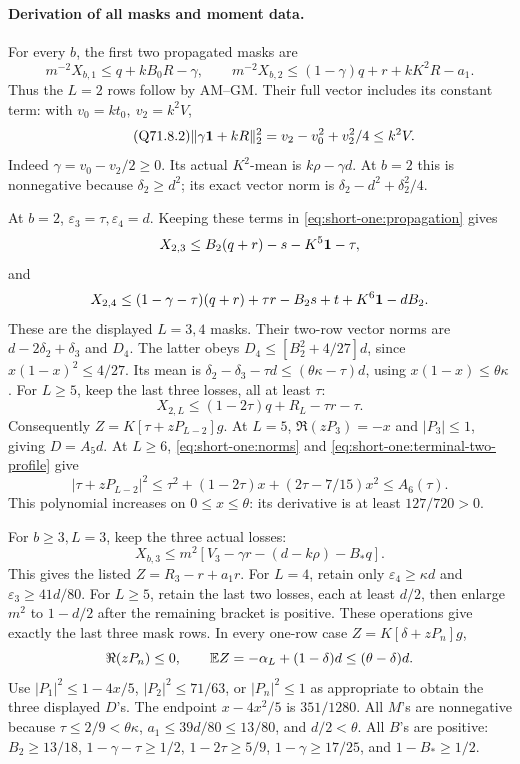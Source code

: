 \paragraph{Derivation of all masks and moment data.}
For every \(b\), the first two propagated masks are
\[
 m^{-2}X_{b,1}\le q+kB_0R-\gamma,\qquad
 m^{-2}X_{b,2}\le(1-\gamma)q+r+kK^2R-a_1 .
\]
Thus the \(L=2\) rows follow by AM--GM. Their full vector includes
its constant term: with \(v_0=kt_0,\ v_2=k^2V\),
\begin{equation}\tag{Q71.8.2}\label{eq:Q71:8.2}
 \|\gamma\mathbf1+kR\|_2^2=v_2-v_0^2+v_2^2/4\le k^2V .
\end{equation}
Indeed \(\gamma=v_0-v_2/2\ge0\). Its actual \(K^2\)-mean is
\(k\rho-\gamma d\). At \(b=2\) this is nonnegative because
\(\delta_2\ge d^2\); its exact vector norm is
\(\delta_2-d^2+\delta_2^2/4\).

At \(b=2\), \(\varepsilon_3=\tau,\varepsilon_4=d\). Keeping
these terms in \eqref{eq:short-one:propagation} gives
\[
 X_{2,3}\le B_2(q+r)-s-K^5\mathbf1-\tau,
\]
and
\[
 X_{2,4}\le(1-\gamma-\tau)(q+r)
       +\tau r-B_2s+t+K^6\mathbf1-dB_2 .
\]
These are the displayed \(L=3,4\) masks. Their two-row vector norms
are \(d-2\delta_2+\delta_3\) and \(D_4\).
The latter obeys \(D_4\le[B_2^2+4/27]d\), since
\(x(1-x)^2\le4/27\).
Its mean is \(\delta_2-\delta_3-\tau d
\le(\theta\kappa-\tau)d\), using \(x(1-x)\le\theta\kappa\).
For \(L\ge5\), keep the last three losses, all at least \(\tau\):
\[
 X_{2,L}\le(1-2\tau)q+R_L-\tau r-\tau .
\]
Consequently \(Z=K[\tau+zP_{L-2}]g\).
At \(L=5\), \(\Re(zP_3)=-x\) and \(|P_3|\le1\), giving \(D=A_5d\).
At \(L\ge6\), \eqref{eq:short-one:norms} and
\eqref{eq:short-one:terminal-two-profile} give
\[
 |\tau+zP_{L-2}|^2
 \le\tau^2+(1-2\tau)x+(2\tau-7/15)x^2
 \le A_6(\tau).
\]
This polynomial increases on \(0\le x\le\theta\):
its derivative is at least \(127/720>0\).

For \(b\ge3,L=3\), keep the three actual losses:
\[
 X_{b,3}\le m^2[V_3-\gamma r-(d-k\rho)-B_*q] .
\]
This gives the listed \(Z=R_3-r+a_1r\).
For \(L=4\), retain only \(\varepsilon_4\ge\kappa d\) and
\(\varepsilon_3\ge41d/80\). For \(L\ge5\), retain the last two
losses, each at least \(d/2\), then enlarge \(m^2\) to \(1-d/2\)
after the remaining bracket is positive.
These operations give exactly the last three mask rows.
In every one-row case \(Z=K[\delta+zP_n]g\),
\[
 \Re(zP_n)\le0,\qquad
 \mathbb E Z=-\alpha_L+(1-\delta)d\le(\theta-\delta)d .
\]
Use \(|P_1|^2\le1-4x/5\), \(|P_2|^2\le71/63\), or
\(|P_n|^2\le1\) as appropriate to obtain the three displayed \(D\)'s.
The endpoint \(x-4x^2/5\) is \(351/1280\).
All \(M\)'s are nonnegative because
\(\tau\le2/9<\theta\kappa\), \(a_1\le39d/80\le13/80\),
and \(d/2<\theta\).
All \(B\)'s are positive: \(B_2\ge13/18\),
\(1-\gamma-\tau\ge1/2\), \(1-2\tau\ge5/9\),
\(1-\gamma\ge17/25\), and \(1-B_*\ge1/2\).

